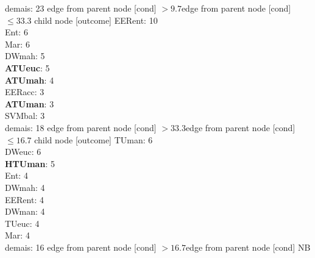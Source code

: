 {{{{{demais: 23} edge from parent node [cond] {$>9.7$}}edge from parent node [cond] {$\leq33.3$}}
child {node [outcome] {
EERent: 10\\
Ent: 6\\
Mar: 6\\
DWmah: 5\\
\textbf{ATUeuc}: 5\\
\textbf{ATUmah}: 4\\
EERacc: 3\\
\textbf{ATUman}: 3\\
SVMbal: 3\\
demais: 18} edge from parent node [cond] {$>33.3$}}edge from parent node [cond] {$\leq16.7$}}
child {node [outcome] {
TUman: 6\\
DWeuc: 6\\
\textbf{HTUman}: 5\\
Ent: 4\\
DWmah: 4\\
EERent: 4\\
DWman: 4\\
TUeuc: 4\\
Mar: 4\\
demais: 16} edge from parent node [cond] {$>16.7$}}edge from parent node [cond] {NB}}
